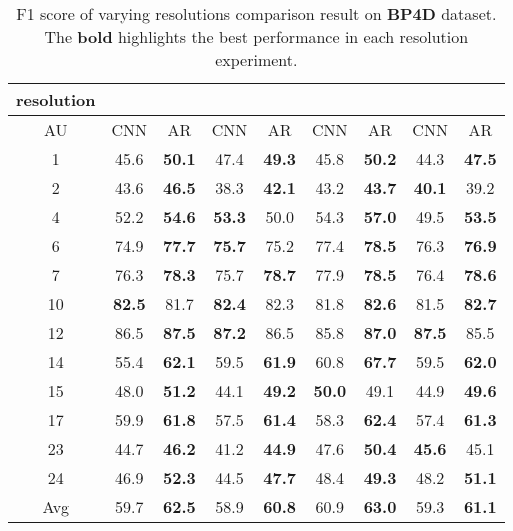 \documentclass[5p,twocolumn]{elsarticle}
\begin{document}
\begin{table}
	\scriptsize
	\centering
	
	\setlength{\abovecaptionskip}{0pt} 
	
	\caption{F1 score of varying resolutions comparison result on \textbf{BP4D} dataset. The \textbf{bold} highlights the best performance in each resolution experiment.}
	\label{tab:BP4D_resolution}
	\centering
	\tabcolsep=0.05cm
	\begin{tabular}{ccc @{\hspace{5\tabcolsep}} cc @{\hspace{5\tabcolsep}} cc @{\hspace{5\tabcolsep}} cc}
		
		\toprule
		resolution & \multicolumn{2}{c}{} & \multicolumn{2}{c}{} & \multicolumn{2}{c}{} & \multicolumn{2}{c}{} \\
		\midrule
		AU & CNN & AR & CNN & AR & CNN & AR & CNN & AR \\
		\midrule
		1 & 45.6 & \textbf{50.1} & 47.4 & \textbf{49.3} & 45.8 & \textbf{50.2} & 44.3 & \textbf{47.5} \\
		2 & 43.6 & \textbf{46.5} & 38.3 & \textbf{42.1} & 43.2 & \textbf{43.7} & \textbf{40.1} & 39.2 \\
		4 & 52.2 & \textbf{54.6} & \textbf{53.3} & 50.0 & 54.3 & \textbf{57.0} & 49.5 & \textbf{53.5} \\ 
		6 & 74.9 & \textbf{77.7} & \textbf{75.7} & 75.2 & 77.4 & \textbf{78.5} & 76.3 & \textbf{76.9} \\
		7 & 76.3 & \textbf{78.3} & 75.7 & \textbf{78.7} & 77.9 & \textbf{78.5} & 76.4 & \textbf{78.6} \\
		10 & \textbf{82.5} & 81.7 & \textbf{82.4} & 82.3 & 81.8 & \textbf{82.6} & 81.5 & \textbf{82.7} \\
		12 & 86.5 & \textbf{87.5} & \textbf{87.2} & 86.5 & 85.8 & \textbf{87.0} & \textbf{87.5} & 85.5 \\
		14 & 55.4 & \textbf{62.1} & 59.5 & \textbf{61.9} & 60.8 & \textbf{67.7} & 59.5 & \textbf{62.0} \\
		15 & 48.0 & \textbf{51.2} & 44.1 & \textbf{49.2} & \textbf{50.0} & 49.1 & 44.9 & \textbf{49.6} \\
		17 & 59.9 & \textbf{61.8} & 57.5 & \textbf{61.4} & 58.3 & \textbf{62.4} & 57.4 & \textbf{61.3} \\
		23 & 44.7 & \textbf{46.2} & 41.2 & \textbf{44.9} & 47.6 & \textbf{50.4} & \textbf{45.6} & 45.1 \\
		24 & 46.9 & \textbf{52.3} & 44.5 & \textbf{47.7} & 48.4 & \textbf{49.3} & 48.2 & \textbf{51.1} \\
		\midrule
		Avg & 59.7 & \textbf{62.5} & 58.9 & \textbf{60.8} & 60.9 & \textbf{63.0} & 59.3 & \textbf{61.1} \\
		\bottomrule
	\end{tabular}
	\vspace{-0.5cm}
\end{table}
\end{document}
